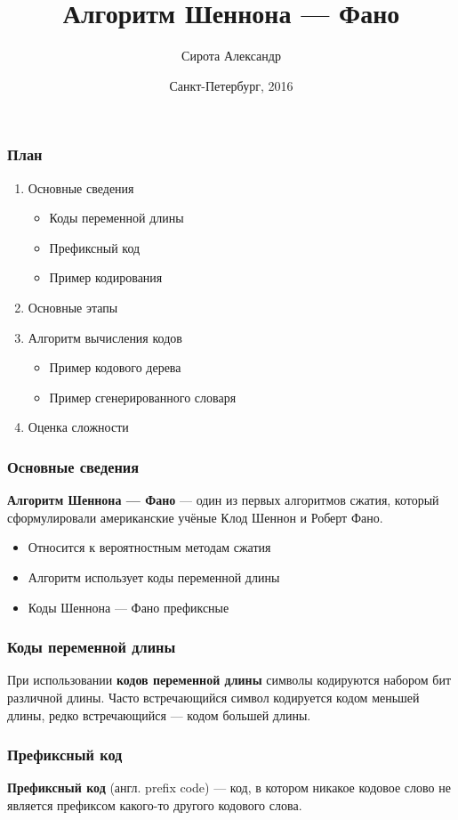 \documentclass[10pt,pdf,hyperref={unicode}]{beamer}
\title{Алгоритм Шеннона --- Фано}
\author{Сирота Александр}
\institute{\normalsize{ГУАП} \\ \scriptsize{5 факультет \\ Группа 5511}}
\date[3pt]{\scriptsize{Санкт-Петербург, 2016}}
\begin{document}
\begin{frame}
	\titlepage
\end{frame}

\begin{frame}
	\frametitle{План}

	\begin{enumerate}
		\item Основные сведения
		\begin{itemize}
			\item Коды переменной длины
			\item Префиксный код
			\item Пример кодирования
		\end{itemize}
		\item Основные этапы
		\item Алгоритм вычисления кодов
		\begin{itemize}
			\item Пример кодового дерева
			\item Пример сгенерированного словаря
		\end{itemize}
		\item Оценка сложности
	\end{enumerate}
\end{frame}

\begin{frame}
	\frametitle{Основные сведения}
	\textbf{Алгоритм Шеннона --- Фано} --- один из первых алгоритмов 
	сжатия, который сформулировали американские учёные Клод Шеннон и Роберт 
	Фано.
	\begin{itemize}
		\item Относится к вероятностным методам сжатия
		\item Алгоритм использует коды переменной длины
		\item Коды Шеннона --- Фано префиксные
	\end{itemize}
\end{frame}

\begin{frame}
	\frametitle{Коды переменной длины}
	При использовании \textbf{кодов переменной длины} символы кодируются набором бит различной длины.
	Часто встречающийся символ кодируется кодом меньшей длины, редко встречающийся --- кодом большей длины.
\end{frame}

\begin{frame}
	\frametitle{Префиксный код}
	\textbf{Префиксный код} (англ. prefix code) --- код, в котором никакое кодовое слово не является префиксом какого-то другого кодового слова.
\end{frame}
\end{document}
